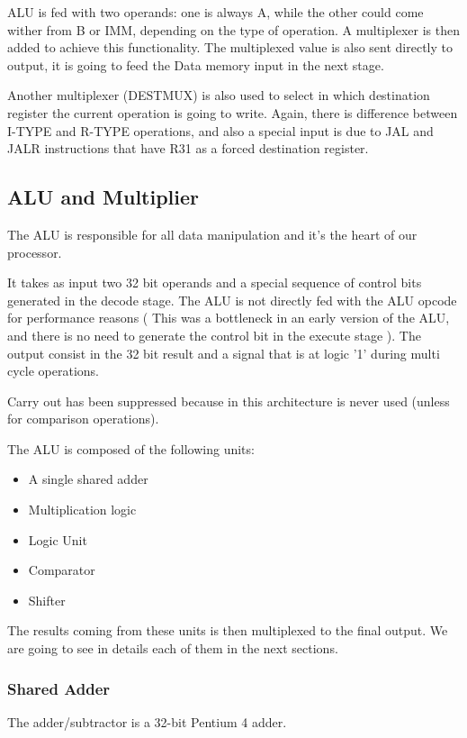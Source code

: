 \documentclass[12pt]{article}
\begin{document}
ALU is fed with two operands: one is always A, while the other could come wither from B or IMM, depending on the type of operation. A multiplexer is then added to achieve this functionality.
The multiplexed value is also sent directly to output, it is going to feed the Data memory input in the next stage.

Another multiplexer (DESTMUX) is also used to select in which destination register the current operation is going to write. Again, there is difference between I-TYPE and R-TYPE operations, and also a special input is due to JAL and JALR instructions that have R31 as a forced destination register.

 
\subsection{ALU and Multiplier}
The ALU is responsible for all data manipulation and it's the heart of our processor.

It takes as input two 32 bit operands and a special sequence of control bits generated in the decode stage. The ALU is not directly fed with the ALU opcode for performance reasons ( This was a bottleneck in an early version of the ALU, and there is no need to generate the control bit in the execute stage ).
The output consist in the 32 bit result and a signal that is at logic '1' during multi cycle operations.

Carry out has been suppressed because in this architecture is never used (unless for comparison operations).

The ALU is composed of the following units:

\begin{itemize}
	\item A single shared adder
	\item Multiplication logic
	\item Logic Unit
	\item Comparator
	\item Shifter
\end{itemize}

The results coming from these units is then multiplexed to the final output.
We are going to see in details each of them in the next sections.

\subsubsection{Shared Adder}
The adder/subtractor is a 32-bit Pentium 4 adder.
\end{document}
